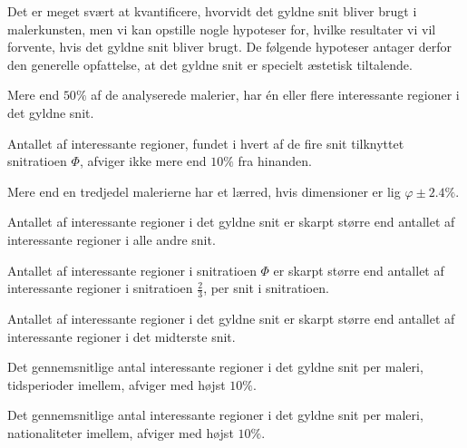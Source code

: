 {
{\sffamily Det er meget svært at kvantificere, hvorvidt det gyldne snit
bliver brugt i malerkunsten, men vi kan opstille nogle hypoteser for,
hvilke resultater vi vil forvente, hvis det gyldne snit bliver brugt.
De følgende hypoteser antager derfor den generelle opfattelse, at det
gyldne snit er specielt æstetisk tiltalende.
}

\begin{hypotese}
    Mere end $50\%$ af de analyserede malerier, har én eller flere
    interessante regioner i det gyldne snit.
    \label{hypo_binaer}
\end{hypotese}

\begin{hypotese}
    Antallet af interessante regioner, fundet i hvert af de fire snit
    tilknyttet snitratioen $\varPhi$, afviger ikke mere end $10\%$ fra
    hinanden.
    \label{hypo_fire_g_snit}
\end{hypotese}

\begin{hypotese}
    Mere end en tredjedel malerierne har et lærred, hvis
    dimensioner er lig $\varphi\pm2.4\%$.
    \label{hypo_golden_ractangle}
\end{hypotese}

\begin{hypotese}
    Antallet af interessante regioner i det gyldne snit er skarpt større end
    antallet af interessante regioner i alle andre snit.
    \label{hypo_alle_andre_snit}
\end{hypotese}

\begin{hypotese}
    Antallet af interessante regioner i snitratioen $\varPhi$ er skarpt
    større end antallet af interessante regioner i snitratioen $\frac{2}{3}$,
    per snit i snitratioen.
    \label{hypo_to_tredjedele}
\end{hypotese}

\begin{hypotese}
    Antallet af interessante regioner i det gyldne snit er skarpt større end
    antallet af interessante regioner i det midterste snit.
    \label{hypo_midten}
\end{hypotese}

\begin{hypotese}
    Det gennemsnitlige antal interessante regioner i det gyldne snit per
    maleri, tidsperioder imellem, afviger med højst $10\%$.
    \label{hypo_tid}
\end{hypotese}

\begin{hypotese}
    Det gennemsnitlige antal interessante regioner i det gyldne snit per
    maleri, nationaliteter imellem, afviger med højst $10\%$.
    \label{hypo_nation}
\end{hypotese}

}
